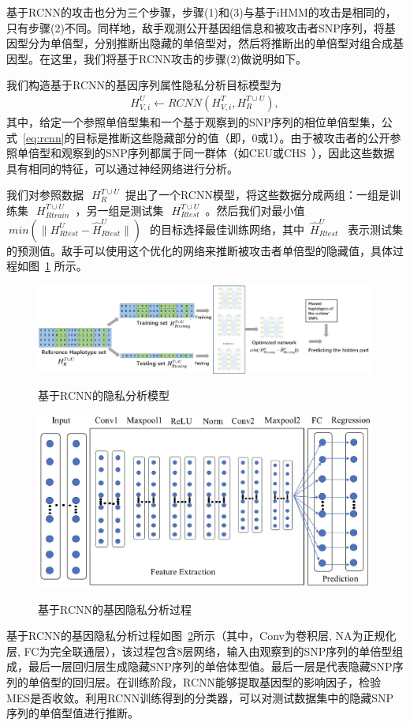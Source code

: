 基于RCNN的攻击也分为三个步骤，步骤(1)和(3)与基于iHMM的攻击是相同的，只有步骤(2)不同。同样地，敌手观测公开基因组信息和被攻击者SNP序列，将基因型分为单倍型，分别推断出隐藏的单倍型对，然后将推断出的单倍型对组合成基因型。在这里，我们将基于RCNN攻击的步骤(2)做说明如下。

我们构造基于RCNN的基因序列属性隐私分析目标模型为
\begin{align}\label{eq:rcnn}
H_{V,i}^U  \leftarrow RCNN(H_{V,i}^T, H_R^{T \cup U}),
\end{align}
其中，给定一个参照单倍型集和一个基于观察到的SNP序列的相位单倍型集，公式~\ref{eq:rcnn}的目标是推断这些隐藏部分的值（即，0或1）。由于被攻击者的公开参照单倍型和观察到的SNP序列都属于同一群体（如CEU或CHS~\cite{igsr2015which}），因此这些数据具有相同的特征，可以通过神经网络进行分析。

我们对参照数据~$~H_R^{T \cup U}$~提出了一个RCNN模型，将这些数据分成两组：一组是训练集~$~H_{Rtrain}^{T \cup U}$~，另一组是测试集~$~H_{Rtest}^{T \cup U}$~。然后我们对最小值~$~min(\|H_{Rtest}^{ U} - \hat{H}_{Rtest}^{U}\|)~$~的目标选择最佳训练网络，其中~$\hat{H}_{Rtest}^{U}$~ 表示测试集的预测值。敌手可以使用这个优化的网络来推断被攻击者单倍型的隐藏值，具体过程如图~\ref{fig:rcnn_infer} 所示。

\begin{figure}[htbp]
	\centering
	\includegraphics[width=0.95\linewidth]{./figures/Fig3-RCNN-inference-attack.eps}\\
	\caption{基于RCNN的隐私分析模型}
	\label{fig:rcnn_infer}
\end{figure}


\begin{figure}[htbp]
	\centering
	\includegraphics[width=0.7\linewidth]{./figures/Fig4-RCNN-structure.eps}\\
	\caption{基于RCNN的基因隐私分析过程}
	\label{fig:RCNN}
\end{figure}
基于RCNN的基因隐私分析过程如图~\ref{fig:RCNN}所示（其中，Conv为卷积层, NA为正规化层, FC为完全联通层），该过程包含8层网络，输入由观察到的SNP序列的单倍型组成，最后一层回归层生成隐藏SNP序列的单倍体型值。最后一层是代表隐藏SNP序列的单倍型的回归层。在训练阶段，RCNN能够提取基因型的影响因子，检验MES是否收敛。利用RCNN训练得到的分类器，可以对测试数据集中的隐藏SNP序列的单倍型值进行推断。

